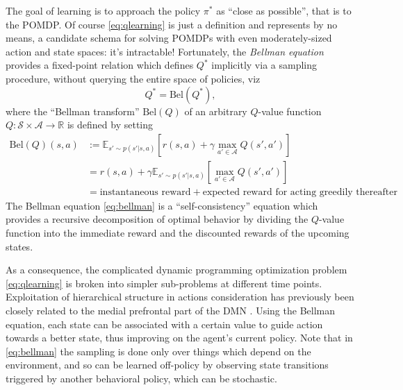 \documentclass[10pt,letterpaper]{article}
\begin{document}
The goal of learning is to approach the policy $\pi^*$ as ``close as possible'', that is to  the POMDP.
Of course \eqref{eq:qlearning} is just a definition and
represents by no means, a candidate schema for solving POMDPs with even moderately-sized action and state spaces: it's intractable!
Fortunately, the \textit{Bellman equation} \citep{sutton1998reinforcement} provides a fixed-point relation which defines $Q^*$ implicitly via a sampling procedure, without querying the entire space of policies, viz
\begin{equation}
  Q^* = \text{Bel}(Q^*),
  \label{eq:bellman}
\end{equation}
where the ``Bellman transform'' $\text{Bel}(Q)$ of an arbitrary $Q$-value function $Q: \mathcal S \times \mathcal A \rightarrow \mathbb R$  is defined by setting
\begin{equation}
  \begin{split}
   \text{Bel}(Q)(s,a) &:=
   \mathbb E_{s' \sim p(s'|s,a)} [r(s,a) + \gamma \max_{a' \in \mathcal A}Q(s', a')]\\
   &= r(s,a) + \gamma\mathbb E_{s' \sim p(s'|s,a)} [\max_{a' \in \mathcal A}Q(s', a')]\\
   &= \text{instantaneous reward} + \text{expected reward for acting greedily thereafter}
    \end{split}
  \end{equation}
The Bellman equation \eqref{eq:bellman} is a ``self-consistency'' equation which provides
a recursive decomposition of optimal behavior by dividing the $Q$-value function into the immediate
reward and the discounted rewards of the upcoming states.


As a consequence, the complicated dynamic programming optimization problem \eqref{eq:qlearning}
is broken into simpler sub-problems at different time points.
Exploitation of hierarchical structure in actions consideration
has previously been closely related to the medial prefrontal part of the DMN
\citep{koechlin1999role, braver2002role}.
Using the Bellman equation, each state can be associated with a certain value
to guide action towards a better state, thus improving on the agent's current policy.
Note that in \eqref{eq:bellman} the sampling is done only over things which
depend on the environment, and so can be learned off-policy by observing state transitions
triggered by another behavioral policy, which can be stochastic.
\end{document}
